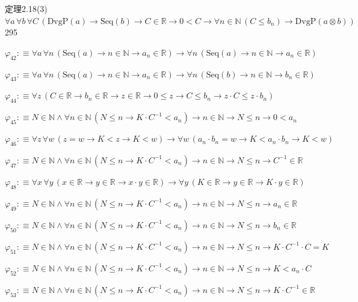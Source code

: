 \begin{fullproof}{定理2.18(3)}{$\forall a\,\forall b\,\forall C\,(\mathrm{DvgP}(a) \to \mathrm{Seq}(b) \to C \in \mathbb{R} \to 0 < C \to \forall n \in \mathbb{N}\,(C \leq b_{n}) \to \mathrm{DvgP}(a \otimes b))$}{295}
\begin{abbrevlist}
\item $\varphi_{42} :\equiv \forall a\,\forall n\,(\mathrm{Seq}(a) \to n \in \mathbb{N} \to a_{n} \in \mathbb{R}) \to \forall n\,(\mathrm{Seq}(a) \to n \in \mathbb{N} \to a_{n} \in \mathbb{R})$
\item $\varphi_{43} :\equiv \forall a\,\forall n\,(\mathrm{Seq}(a) \to n \in \mathbb{N} \to a_{n} \in \mathbb{R}) \to \forall n\,(\mathrm{Seq}(b) \to n \in \mathbb{N} \to b_{n} \in \mathbb{R})$
\item $\varphi_{44} :\equiv \forall z\,(C \in \mathbb{R} \to b_{n} \in \mathbb{R} \to z \in \mathbb{R} \to 0 \leq z \to C \leq b_{n} \to z \cdot C \leq z \cdot b_{n})$
\item $\varphi_{45} :\equiv N \in \mathbb{N} \land \forall n \in \mathbb{N}\,(N \leq n \to K \cdot C^{-1} < a_{n}) \to n \in \mathbb{N} \to N \leq n \to 0 < a_{n}$
\item $\varphi_{46} :\equiv \forall z\,\forall w\,(z = w \to K < z \to K < w) \to \forall w\,(a_{n} \cdot b_{n} = w \to K < a_{n} \cdot b_{n} \to K < w)$
\item $\varphi_{47} :\equiv N \in \mathbb{N} \land \forall n \in \mathbb{N}\,(N \leq n \to K \cdot C^{-1} < a_{n}) \to n \in \mathbb{N} \to N \leq n \to C^{-1} \in \mathbb{R}$
\item $\varphi_{48} :\equiv \forall x\,\forall y\,(x \in \mathbb{R} \to y \in \mathbb{R} \to x \cdot y \in \mathbb{R}) \to \forall y\,(K \in \mathbb{R} \to y \in \mathbb{R} \to K \cdot y \in \mathbb{R})$
\item $\varphi_{49} :\equiv N \in \mathbb{N} \land \forall n \in \mathbb{N}\,(N \leq n \to K \cdot C^{-1} < a_{n}) \to n \in \mathbb{N} \to N \leq n \to a_{n} \in \mathbb{R}$
\item $\varphi_{50} :\equiv N \in \mathbb{N} \land \forall n \in \mathbb{N}\,(N \leq n \to K \cdot C^{-1} < a_{n}) \to n \in \mathbb{N} \to N \leq n \to b_{n} \in \mathbb{R}$
\item $\varphi_{51} :\equiv N \in \mathbb{N} \land \forall n \in \mathbb{N}\,(N \leq n \to K \cdot C^{-1} < a_{n}) \to n \in \mathbb{N} \to N \leq n \to K \cdot C^{-1} \cdot C = K$
\item $\varphi_{52} :\equiv N \in \mathbb{N} \land \forall n \in \mathbb{N}\,(N \leq n \to K \cdot C^{-1} < a_{n}) \to n \in \mathbb{N} \to N \leq n \to K < a_{n} \cdot C$
\item $\varphi_{53} :\equiv N \in \mathbb{N} \land \forall n \in \mathbb{N}\,(N \leq n \to K \cdot C^{-1} < a_{n}) \to n \in \mathbb{N} \to N \leq n \to K \cdot C^{-1} \in \mathbb{R}$

\end{abbrevlist}
\end{fullproof}
